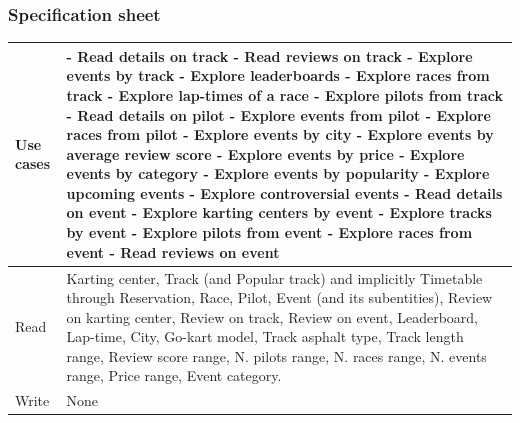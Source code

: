 \documentclass{beamer}
\begin{document}
\begin{frame}
    \frametitle{Specification sheet}
    \begin{table}
        \tiny
        \begin{tabular}{|p{2cm}|p{6cm}|}
        \hline
        Use cases &
        - Read details on track \newline
        - Read reviews on track \newline
        - Explore events by track \newline
        - Explore leaderboards \newline
        - Explore races from track \newline
        - Explore lap-times of a race \newline
        - Explore pilots from track \newline
        - Read details on pilot \newline
        - Explore events from pilot \newline
        - Explore races from pilot \newline
        - Explore events by city \newline
        - Explore events by average review score \newline
        - Explore events by price \newline
        - Explore events by category \newline
        - Explore events by popularity \newline
        - Explore upcoming events \newline
        - Explore controversial events \newline
        - Read details on event \newline
        - Explore karting centers by event \newline
        - Explore tracks by event \newline
        - Explore pilots from event \newline
        - Explore races from event \newline
        - Read reviews on event \\
        \hline
        Read & Karting center, Track (and Popular track) and implicitly Timetable through Reservation, Race, Pilot, Event (and its subentities),
        Review on karting center, Review on track, Review on event, Leaderboard, Lap-time, \newline
        City, Go-kart model, Track asphalt type, Track length range, Review score range, N. pilots range,
        N. races range, N. events range, Price range, Event category. \\
        \hline
        Write & None \\
        \hline
        \end{tabular}
    \end{table}
\end{frame}
\end{document}
